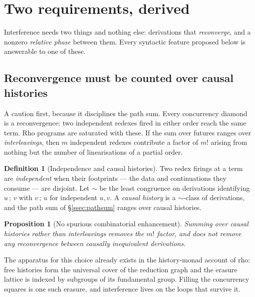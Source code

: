 \documentclass[11pt,a4paper]{article}
\theoremstyle{plain}
\newtheorem{proposition}[theorem]{Proposition}
\theoremstyle{definition}
\newtheorem{definition}[theorem]{Definition}
\theoremstyle{remark}
\begin{document}
\section{Two requirements, derived}\label{sec:requirements}

Interference needs two things and nothing else: derivations that
\emph{reconverge}, and a nonzero \emph{relative phase} between them. Every
syntactic feature proposed below is answerable to one of these.

\subsection{Reconvergence must be counted over causal histories}

A caution first, because it disciplines the path sum. Every concurrency diamond
is a reconvergence: two independent redexes fired in either order reach the same
term. Rho programs are saturated with these. If the sum over futures ranges over
\emph{interleavings}, then $m$ independent redexes contribute a factor of $m!$
arising from nothing but the number of linearisations of a partial order.

\begin{definition}[Independence and causal histories]\label{def:causal}
Two redex firings at a term are \emph{independent} when their footprints ---
the data and continuations they consume --- are disjoint. Let $\sim$ be the least
congruence on derivations identifying $u\,;\,v$ with $v\,;\,u$ for independent
$u,v$. A \emph{causal history} is a $\sim$-class of derivations, and the path sum
of \S\ref{ssec:pathsum} ranges over causal histories.
\end{definition}

\begin{proposition}[No spurious combinatorial enhancement]\label{prop:causal}
Summing over causal histories rather than interleavings removes the $m!$ factor,
and does not remove any reconvergence between causally inequivalent derivations.
\end{proposition}

The apparatus for this choice already exists in the history-monad account of
rho: free histories form the universal cover of the reduction graph and the
erasure lattice is indexed by subgroups of its fundamental group. Filling the
concurrency squares is one such erasure, and interference lives on the loops
that survive it.
\end{document}

